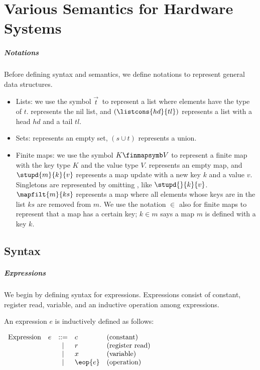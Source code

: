\chapter{Various Semantics for Hardware Systems}
\label{chap-semantics}

\paragraph{Notations}

Before defining syntax and semantics, we define notations to represent
general data structures.
\begin{itemize}
\item Lists: we use the symbol $\vec{t}\ $ to represent a list where
  elements have the type of $t$. \listnil{} represents the nil list,
  and $(\listcons{hd}{tl})$ represents a list with a head $hd$ and a
  tail $tl$.
\item Sets: \emptyset{} represents an empty set, $(s \cup t)$
  represents a union.
\item Finite maps: we use the symbol $K \finmapsymb V$ to represent a
  finite map with the key type $K$ and the value type $V$. \emptymap{}
  represents an empty map, and $\stupd{m}{k}{v}$ represents a map
  update with a new key $k$ and a value $v$. Singletons are
  represented by omitting \emptymap{}, like $\stupd{}{k}{v}$.
  $\mapfilt{m}{ks}$ represents a map where all elements whose keys are
  in the list $ks$ are removed from $m$. We use the notation $\in$
  also for finite maps to represent that a map has a certain key; $k
  \in m$ says a map $m$ is defined with a key $k$.
\end{itemize}

\section{Syntax}

\paragraph{Expressions}
We begin by defining syntax for expressions. Expressions
consist of constant, register read, variable, and an inductive
operation among expressions.

\begin{definition}
  \label{def-expression}
  An expression $e$ is inductively defined as follows:
  \begin{center}
    \begin{math}
      \begin{array}{rcll}
        \textrm{Expression}\quad e & ::= & c & \textrm{(constant)} \\
        & | & r & \textrm{(register read)} \\
        & | & x & \textrm{(variable)} \\
        & | & \eop{e} & \textrm{(operation)} \\
      \end{array}
    \end{math}
  \end{center}
\end{definition}

